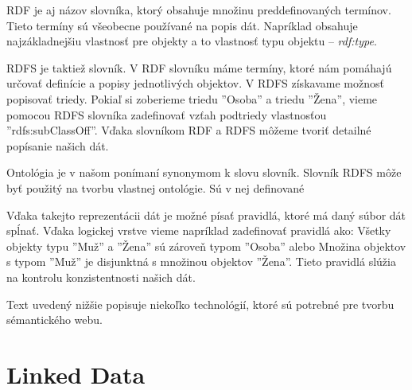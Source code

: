 \documentclass[12pt, a4paper, oneside]{book}
\begin{document}
RDF je aj názov slovníka, ktorý obsahuje množinu preddefinovaných termínov. Tieto termíny sú všeobecne používané na popis dát. Napríklad obsahuje najzákladnejšiu vlastnosť pre objekty a to vlastnosť typu objektu -- \textit{rdf:type}. 


RDFS je taktiež slovník. V RDF slovníku máme termíny, ktoré nám pomáhajú určovať definície a popisy jednotlivých objektov. V RDFS získavame možnosť popisovať triedy. Pokiaľ si zoberieme triedu ''Osoba'' a triedu ''Žena'', vieme pomocou RDFS slovníka zadefinovať vzťah podtriedy vlastnosťou ''rdfs:subClassOff''. Vďaka slovníkom RDF a RDFS môžeme tvoriť detailné popísanie našich dát.


Ontológia je v našom ponímaní synonymom k slovu slovník. Slovník RDFS môže byť použitý na tvorbu vlastnej ontológie. Sú v nej definované 


Vďaka takejto reprezentácii dát je možné písať pravidlá, ktoré má daný súbor dát spĺnať. Vďaka logickej vrstve vieme napríklad zadefinovať pravidlá ako: Všetky objekty typu ''Muž'' a ''Žena'' sú zároveň typom ''Osoba'' alebo Množina objektov s typom ''Muž'' je disjunktná s množinou objektov ''Žena''. Tieto pravidlá slúžia na kontrolu konzistentnosti našich dát.





Text uvedený nižšie popisuje niekoľko technológií, ktoré sú potrebné pre tvorbu sémantického webu.

\section{Linked Data}

\end{document}
